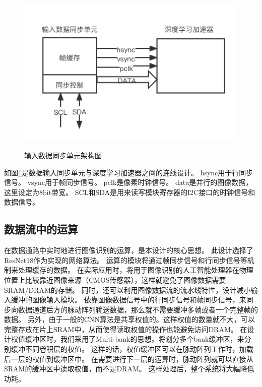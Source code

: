 \begin{figure}[htbp]
    \centering
    \includegraphics[width=12cm,height=8cm]{figures/input_data_adapter.png}
    \caption{输入数据同步单元架构图}
    \label{fig:input_data_adapter}
\end{figure}

如图\ref{fig:input_data_adapter}是数据输入同步单元与深度学习加速器之间的连线设计。
hsync用于行同步信号。
vsync用于帧同步信号。
pclk是像素时钟信号。
data是并行的图像数据，这里设定为8bit带宽。
SCL和SDA是用来读写模块寄存器的I2C接口的时钟信号和数据信号。


\subsection{数据流中的运算}

在数据通路中实时地进行图像识别的运算，是本设计的核心思想。
此设计选择了ResNet18作为实现的网络算法。
运算的模块将通过帧同步信号和行同步信号等机制来处理缓存的数据。
在实际应用时，将用于图像识别的人工智能处理器在物理位置上比较靠近图像来源（CMOS传感器），这样就避免了图像数据需要SRAM/DRAM的存储。
同时，还可以利用图像数据流的流水线特性，设计减小输入缓冲的图像输入模块。
依靠图像数据信号中的行同步信号和帧同步信号，来同步向数据通道后方的脉动阵列输送数据，那么就不需要缓冲多帧或者一个完整帧的数据。
另外，由于一般的CNN算法是共享权值的。这样权值的数量就不大，可以完整存放在片上SRAM中，从而使得读取权值的操作也能避免访问DRAM。
在设计权值缓冲区时，我们采用了Multi-bank的思想。将划分多个bank缓冲区，来分别缓冲不同卷积层的权值。
这样的话，权值缓冲区可以在脉动阵列工作时，加载后一层的权值到缓冲区中。
在需要进行下一层的运算时，脉动阵列就可以直接从SRAM的缓冲区中读取权值，而不是DRAM。
这样处理后，整个系统将大幅降低功耗。

